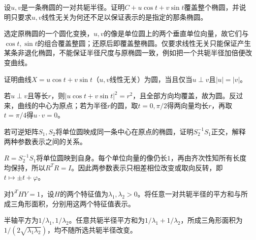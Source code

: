 设\(u,v\)是一条椭圆的一对共轭半径。证明\(C+u\cos t+v\sin t\)覆盖整个椭圆，并说明只要求\(u,v\)线性无关为何还不足以保证表示的是指定的那条椭圆。
\par
\solutionanswer
选定原椭圆的一个圆化变换，\(u,v\)的像是单位圆上的两个垂直单位向量，故它们与\(\cos t,\sin t\)的组合覆盖整圆；还原后即覆盖整椭圆。仅要求线性无关只能保证产生某条非退化椭圆，不能保证半径尺度与原椭圆一致，例如把一个共轭半径加倍便改变曲线。


证明曲线\(X=u\cos t+v\sin t\)（\(u,v\)线性无关）为圆，当且仅当\(u\perp v\)且\(|u|=|v|\)。
\par
\solutionanswer
若\(u\perp v\)且等长\(r\)，则\(|u\cos t+v\sin t|^2=r^2\)，且全部方向均覆盖，故为圆。反过来，曲线的中心为原点；若为半径\(r\)的圆，取\(t=0,\pi/2\)得两向量均长\(r\)，再取\(t=\pi/4\)得\(u\cdot v=0\)。


若可逆矩阵\(S_1,S_2\)将单位圆映成同一条中心在原点的椭圆，证明\(S_2^{-1}S_1\)正交，解释两种参数表示之间的关系。
\par
\solutionanswer
\(R=S_2^{-1}S_1\)将单位圆映到自身。每个单位向量的像仍长\(1\)，再由齐次性知所有长度均保持，所以\(R^TR=I\)。因此两参数表示只相差相位改变或取向反转，即\(t\mapsto\pm t+\varphi\)。


对\(Y^THY=1\)，设\(H\)的两个特征值为\(\lambda_1,\lambda_2>0\)。将任意一对共轭半径的平方和与所成三角形面积，分别用这两个特征值表示。
\par
\solutionanswer
半轴平方为\(1/\lambda_1,1/\lambda_2\)。任意共轭半径平方和为\(1/\lambda_1+1/\lambda_2\)，所成三角形面积为\(1/(2\sqrt{\lambda_1\lambda_2})\)，均不随所选共轭半径改变。
\par
